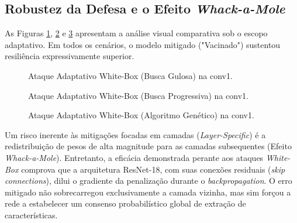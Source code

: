 \documentclass[11pt, a4paper]{article}
\begin{document}
\subsection{Robustez da Defesa e o Efeito \textit{Whack-a-Mole}}
As Figuras \ref{fig:guloso}, \ref{fig:progressivo} e \ref{fig:genetico} apresentam a análise visual comparativa sob o escopo adaptativo. Em todos os cenários, o modelo mitigado ("Vacinado") sustentou resiliência expressivamente superior.

\begin{figure}[htbp]
  \centering
  \caption{Ataque Adaptativo White-Box (Busca Gulosa) na conv1.}
  \label{fig:guloso}
\end{figure}

\begin{figure}[htbp]
  \centering
  \caption{Ataque Adaptativo White-Box (Busca Progressiva) na conv1.}
  \label{fig:progressivo}
\end{figure}

\begin{figure}[htbp]
  \centering
  \caption{Ataque Adaptativo White-Box (Algoritmo Genético) na conv1.}
  \label{fig:genetico}
\end{figure}

Um risco inerente às mitigações focadas em camadas (\textit{Layer-Specific}) é a redistribuição de pesos de alta magnitude para as camadas subsequentes (Efeito \textit{Whack-a-Mole}). Entretanto, a eficácia demonstrada perante aos ataques \textit{White-Box} comprova que a arquitetura ResNet-18, com suas conexões residuais (\textit{skip connections}), dilui o gradiente da penalização durante o \textit{backpropagation}. O erro mitigado não sobrecarregou exclusivamente a camada vizinha, mas sim forçou a rede a estabelecer um consenso probabilístico global de extração de características.
\end{document}
